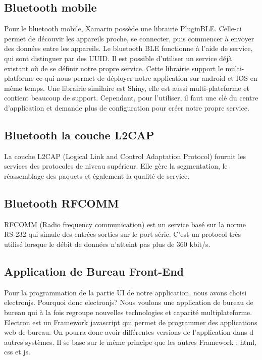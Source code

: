 \documentclass[12pt,fleqn]{article}
\begin{document}
\subsection{Bluetooth mobile}
Pour le bluetooth mobile, Xamarin possède une librairie PluginBLE\cite{PluginBLE}. Celle-ci permet de découvir les appareils proche, se connecter, puis commencer à envoyer des données entre les appareils. Le bluetooth BLE fonctionne à l'aide de service, qui sont distinguer par des UUID. Il est possible d'utiliser un service déjà existant où de se définir notre propre service. Cette librairie support le multi-platforme ce qui nous permet de déployer notre application sur android et IOS en même temps. Une librairie similaire est Shiny\cite{Shiny}, elle est aussi multi-plateforme et contient beaucoup de support. Cependant, pour l'utiliser, il faut une clé du centre d'application et demande plus de configuration pour créer notre propre service. 

\subsection{Bluetooth la couche L2CAP}
La couche L2CAP (Logical Link and Control  Adaptation Protocol) fournit les services des protocoles de niveau supérieur. Elle gère la segmentation, le réassemblage des paquets et également la qualité de service.

\subsection{Bluetooth RFCOMM}
RFCOMM (Radio frequency communication) est un service basé sur la norme RS-232 qui simule des entrées sorties sur le port série. C'est un protocol très utilisé lorsque le débit de données n'atteint pas plus de 360 kbit/s. 


\subsection{Application de Bureau Front-End}	
Pour la programmation de la partie UI de notre application, nous avons choisi electronjs. Pourquoi donc electronjs? 	
Nous voulons une application de bureau de bureau qui à la fois regroupe nouvelles technologies et capacité multiplateforme. Electron est un Framework javascript qui permet de programmer des
 applications web de bureau. On pourra donc avoir différentes versions de l’application dans d autres systèmes. 
 Il se base sur le même principe que les autres Framework : html, css et js.
 
\end{document}
